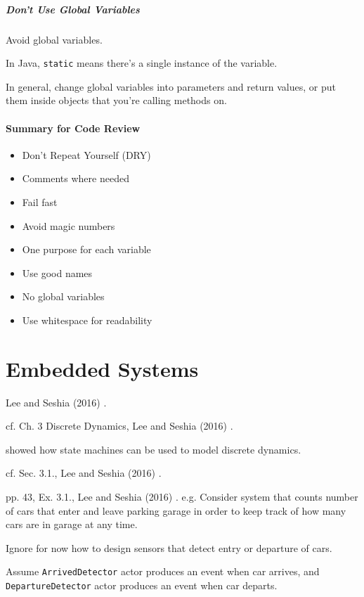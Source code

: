\documentclass[10pt]{amsart}
\begin{document}
\subsubsection{Don't Use Global Variables}

Avoid global variables.

In Java, \verb|static| means there's a single instance of the variable.

In general, change global variables into parameters and return values, or put them inside objects that you're calling methods on.


\subsection{Summary for Code Review}

\begin{itemize}
	\item Don't Repeat Yourself (DRY)
	\item Comments where needed
	\item Fail fast
	\item Avoid magic numbers
	\item One purpose for each variable
	\item Use good names
	\item No global variables
	\item Use whitespace for readability
\end{itemize}



\part{Embedded Systems}

Lee and Seshia (2016) \cite{LeSe2016}.

cf. Ch. 3 Discrete Dynamics, Lee and Seshia (2016) \cite{LeSe2016}. 

showed how state machines can be used to model discrete dynamics.

cf. Sec. 3.1., Lee and Seshia (2016) \cite{LeSe2016}. 

pp. 43, Ex. 3.1., Lee and Seshia (2016) \cite{LeSe2016}. e.g. Consider system that counts number of cars that enter and leave parking garage in order to keep track of how many cars are in garage at any time. 

Ignore for now how to design sensors that detect entry or departure of cars.

Assume \texttt{ArrivedDetector} actor produces an event when car arrives, and \texttt{DepartureDetector} actor produces an event when car departs.
\end{document}
